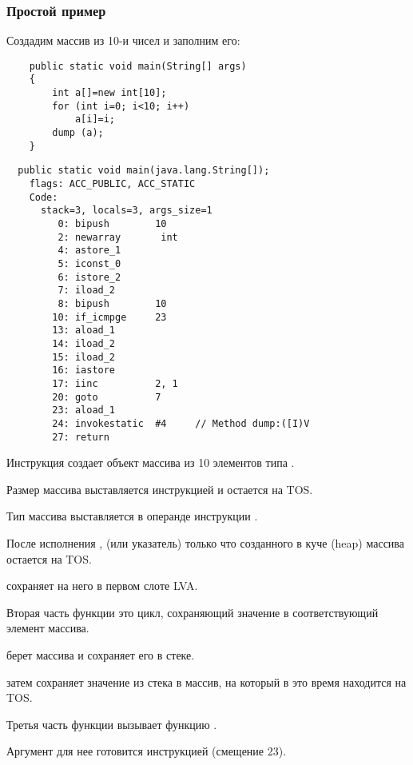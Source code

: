 \subsubsection{Простой пример}

Создадим массив из 10-и чисел и заполним его:

\begin{lstlisting}
	public static void main(String[] args) 
	{
		int a[]=new int[10];
		for (int i=0; i<10; i++)
			a[i]=i;
		dump (a);
	}
\end{lstlisting}

\begin{lstlisting}
  public static void main(java.lang.String[]);
    flags: ACC_PUBLIC, ACC_STATIC
    Code:
      stack=3, locals=3, args_size=1
         0: bipush        10
         2: newarray       int
         4: astore_1      
         5: iconst_0      
         6: istore_2      
         7: iload_2       
         8: bipush        10
        10: if_icmpge     23
        13: aload_1       
        14: iload_2       
        15: iload_2       
        16: iastore       
        17: iinc          2, 1
        20: goto          7
        23: aload_1       
        24: invokestatic  #4     // Method dump:([I)V
        27: return        
\end{lstlisting}

Инструкция  создает объект массива из 10 элементов типа .

Размер массива выставляется инструкцией  и остается на \ac{TOS}.

Тип массива выставляется в операнде инструкции .

После исполнения ,  (или указатель) только что созданного 
в куче (heap) массива остается на \ac{TOS}.

 сохраняет  на него в первом слоте \ac{LVA}.

Вторая часть функции \main это цикл, сохраняющий значение  в соответствующий
элемент массива.

 берет  массива и сохраняет его в стеке.

 затем сохраняет значение из стека в массив, 
 на который в это время находится на \ac{TOS}.

Третья часть функции \main вызывает функцию .

Аргумент для нее готовится инструкцией  (смещение 23).

